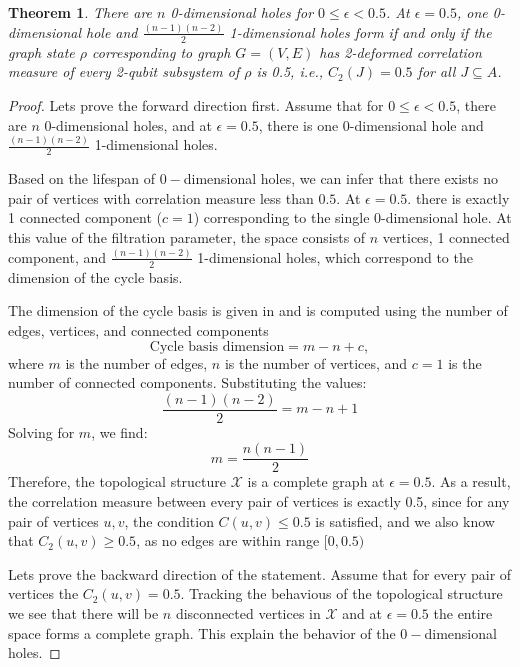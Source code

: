 \documentclass{article}
\newtheorem{theorem}{Theorem}
\begin{document}
\begin{theorem}
\label{thm:betti_number_iff_2-entropy}
There are $ n $ 0-dimensional holes for $ 0 \leq \epsilon < 0.5 $. At $ \epsilon = 0.5 $, one 0-dimensional hole and $ \frac{(n-1)(n-2)}{2} $ 1-dimensional holes form if and only if the graph state $\rho$ corresponding to graph $G =(V, E)$ has 2-deformed correlation measure of every 2-qubit subsystem of $\rho$ is 0.5, i.e., $C_2(J) = 0.5$ for all $J \subseteq A$.
\end{theorem}
\begin{proof}
Lets prove the forward direction first. Assume that for $ 0 \leq \epsilon < 0.5 $, there are $ n $ 0-dimensional holes, and at $ \epsilon = 0.5 $, there is one 0-dimensional hole and $ \frac{(n-1)(n-2)}{2} $ 1-dimensional holes.

Based on the lifespan of $0-$dimensional holes, we can infer that there exists no pair of vertices with correlation measure less than $0.5$. At $\epsilon = 0.5$. there is exactly 1 connected component ($ c = 1 $) corresponding to the single 0-dimensional hole. At this value of the filtration parameter, the space consists of $ n $ vertices, 1 connected component, and $ \frac{(n-1)(n-2)}{2} $ 1-dimensional holes, which correspond to the dimension of the cycle basis.

The dimension of the cycle basis is given in \cite{hage1996island} and is computed using the number of edges, vertices, and connected components
\begin{equation}
\text{Cycle basis dimension} = m - n + c,
\end{equation}
where $ m $ is the number of edges, $ n $ is the number of vertices, and $ c = 1 $ is the number of connected components. Substituting the values:
\begin{equation}
\frac{(n-1)(n-2)}{2} = m - n + 1
\end{equation}
Solving for $ m $, we find:
\begin{equation}
m = \frac{n(n-1)}{2}
\end{equation}
Therefore, the topological structure \( \mathcal{X} \) is a complete graph at \( \epsilon = 0.5 \). As a result, the correlation measure between every pair of vertices is exactly 0.5, since for any pair of vertices \( u, v \), the condition \( C(u, v) \leq 0.5 \) is satisfied, and we also know that \( C_2(u, v) \geq 0.5 \), as no edges are within range $[0, 0.5)$

Lets prove the backward direction of the statement. Assume that for every pair of vertices the $C_2(u, v) = 0.5$. Tracking the behavious of the topological structure we see that there will be $n$ disconnected vertices in $\mathcal{X}$ and at $\epsilon=0.5$ the entire space forms a complete graph. This explain the behavior of the $0-$dimensional holes.


\end{proof}
\end{document}
